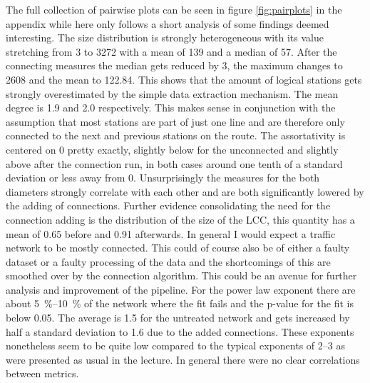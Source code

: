 The full collection of pairwise plots can be seen in figure \ref{fig:pairplots} in the appendix while here only follows a short analysis of some findings deemed interesting.
The size distribution is strongly heterogeneous with its value stretching from 3 to 3272 with a mean of 139 and a median of 57. After the connecting measures the median gets reduced by 3, the maximum changes to 2608 and the mean to \num{122.84}. This shows that the amount of logical stations gets strongly overestimated by the simple data extraction mechanism.
The mean degree is \num{1.9} and \num{2.0} respectively. This makes sense in conjunction with the assumption that most stations are part of just one line and are therefore only connected to the next and previous stations on the route.
The assortativity is centered on 0 pretty exactly, slightly below for the unconnected and slightly above after the connection run, in both cases around one tenth of a standard deviation or less away from 0.
Unsurprisingly the measures for the both diameters strongly correlate with each other and are both significantly lowered by the adding of connections.
Further evidence consolidating the need for the connection adding is the distribution of the size of the LCC, this quantity has a mean of \num{0.65} before and \num{0.91} afterwards. 
In general I would expect a traffic network to be mostly connected.
This could of course also be of either a faulty dataset or a faulty processing of the data and the shortcomings of this are smoothed over by the connection algorithm. 
This could be an avenue for further analysis and improvement of the pipeline.
For the power law exponent there are about \SIrange{5}{10}{\percent} of the network where the fit fails and the p-value for the fit is below \num{0.05}. The average is \num{1.5} for the untreated network and gets increased by half a standard deviation to \num{1.6} due to the added connections. These exponents nonetheless seem to be quite low compared to the typical exponents of \numrange{2}{3} as were presented as usual in the lecture.
In general there were no clear correlations between metrics.
\newpage